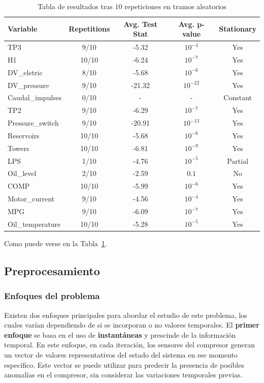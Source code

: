 \documentclass[12pt,letterpaper]{article}
\begin{document}
\begin{table}[htp]
    \centering
    \begin{tabular}{lcccc}
    \hline
    Variable & Repetitions & Avg. Test Stat & Avg. p-value & Stationary \\
    \hline
    TP3 & 9/10 & -5.32 & $10^{-4}$ & Yes \\
    H1 & 10/10 & -6.24 & $10^{-7}$ & Yes \\
    DV\_eletric & 8/10 & -5.68 & $10^{-6}$ & Yes \\
    DV\_pressure & 9/10 & -21.32 & $10^{-22}$ & Yes \\
    Caudal\_impulses & 0/10 & - & - & Constant \\
    TP2 & 9/10 & -6.29 & $10^{-7}$ & Yes \\
    Pressure\_switch & 9/10 & -20.91 & $10^{-13}$ & Yes \\
    Reservoirs & 10/10 & -5.68 & $10^{-6}$ & Yes \\
    Towers & 10/10 & -6.81 & $10^{-9}$ & Yes \\
    LPS & 1/10 & -4.76 & $10^{-5}$ & Partial \\
    Oil\_level & 2/10 & -2.59 & $0.1$ & No \\
    COMP & 10/10 & -5.99 & $10^{-6}$ & Yes \\
    Motor\_current & 9/10 & -4.56 & $10^{-4}$ & Yes \\
    MPG & 9/10 & -6.09 & $10^{-7}$ & Yes \\
    Oil\_temperature & 10/10 & -5.28 & $10^{-5}$ & Yes \\
    \hline
    \end{tabular}
    \caption{Tabla de resultados tras $10$ repeticiones en tramos aleatorios}
    \label{tab:stationary_results}
\end{table}

Como puede verse en la Tabla~\ref{tab:stationary_results}.

\subsection{Preprocesamiento}

\subsubsection{Enfoques del problema}


Existen dos enfoques principales para abordar el estudio de este problema, los cuales varían dependiendo de si se incorporan o no valores temporales. El \textbf{primer enfoque} se basa en el uso de \textbf{instantáneas} y prescinde de la información temporal. En este enfoque, en cada iteración, los sensores del compresor generan un vector de valores representativos del estado del sistema en ese momento específico. Este vector se puede utilizar para predecir la presencia de posibles anomalías en el compresor, sin considerar las variaciones temporales previas.
\end{document}
